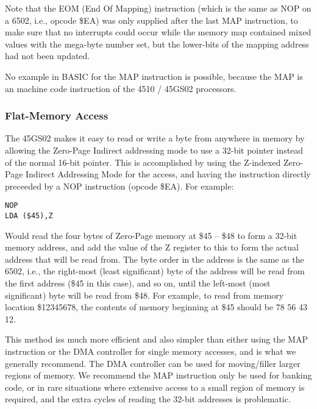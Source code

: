 Note that the EOM (End Of Mapping) instruction (which is the same as NOP on a 6502, i.e., opcode \$EA) was only supplied after the last MAP instruction, to make sure that no interrupts could occur while
the memory map contained mixed values with the mega-byte number set, but the lower-bits of the mapping address had not been
updated.

No example in BASIC for the MAP instruction is possible, because the MAP is an machine code instruction of the 4510 / 45GS02 processors.

\subsubsection{Flat-Memory Access}

The 45GS02 makes it easy to read or write a byte from anywhere in memory by allowing the Zero-Page Indirect
addressing mode to use a 32-bit pointer instead of the normal 16-bit pointer.  This is accomplished by
using the Z-indexed Zero-Page Indirect Addressing Mode for the access, and having the instruction directly
preceeded by a NOP instruction (opcode \$EA).  For example:

\begin{tcolorbox}[colback=black,coltext=white]
\verbatimfont{\codefont}
\begin{verbatim}
NOP
LDA ($45),Z
\end{verbatim}
\end{tcolorbox}

Would read the four bytes of Zero-Page memory at \$45 -- \$48 to form a 32-bit memory address, and add the value of the
Z register to this to form the actual address that will be read from.  The byte order in the address is the same as
the 6502, i.e., the right-most (least significant) byte of the address will be read from the first address (\$45 in this case),
and so on, until the left-most (most significant) byte will be read from \$48.  For example, to read from memory location
\$12345678, the contents of memory beginning at \$45 should be 78 56 43 12.

This method iss much more efficient and also simpler than either using the MAP instruction or the DMA controller for single memory accesses,
and is what we generally recommend.  The DMA controller can be used for moving/filler larger regions of memory.
We recommend the MAP instruction only be used for banking code, or in rare situations where extensive access to a small region of
memory is required, and the extra cycles of reading the 32-bit addresses is problematic.

